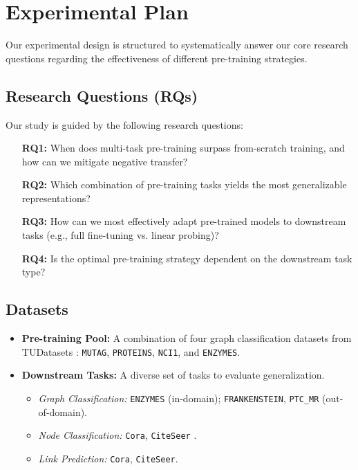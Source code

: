 \documentclass{acmart}
\begin{document}
\section{Experimental Plan}

Our experimental design is structured to systematically answer our core research questions regarding the effectiveness of different pre-training strategies.

\subsection{Research Questions (RQs)}
Our study is guided by the following research questions:
\begin{itemize}
    \item[\textbf{RQ1:}] When does multi-task pre-training surpass from-scratch training, and how can we mitigate negative transfer?
    \item[\textbf{RQ2:}] Which combination of pre-training tasks yields the most generalizable representations?
    \item[\textbf{RQ3:}] How can we most effectively adapt pre-trained models to downstream tasks (e.g., full fine-tuning vs. linear probing)?
    \item[\textbf{RQ4:}] Is the optimal pre-training strategy dependent on the downstream task type?
\end{itemize}

\subsection{Datasets}
\begin{itemize}
    \item \textbf{Pre-training Pool:} A combination of four graph classification datasets from TUDatasets \cite{morris2020tudataset}: \texttt{MUTAG}, \texttt{PROTEINS}, \texttt{NCI1}, and \texttt{ENZYMES}.
    \item \textbf{Downstream Tasks:} A diverse set of tasks to evaluate generalization.
        \begin{itemize}
            \item \textit{Graph Classification:} \texttt{ENZYMES} (in-domain); \texttt{FRANKENSTEIN}, \texttt{PTC\_MR} (out-of-domain).
            \item \textit{Node Classification:} \texttt{Cora}, \texttt{CiteSeer} \cite{sen2008collective}.
            \item \textit{Link Prediction:} \texttt{Cora}, \texttt{CiteSeer}.
        \end{itemize}
\end{itemize}
\end{document}
